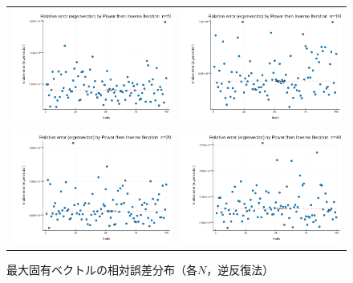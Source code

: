 \documentclass[a4paper,11pt]{ltjsarticle}
\begin{document}
\begin{figure}[H]
  \centering
  \begin{tabular}{cc}
    \includegraphics[width=72mm]{graphs/exp4_n50_relerr_eigenvector.png} &
    \includegraphics[width=72mm]{graphs/exp4_n100_relerr_eigenvector.png} \\
    \includegraphics[width=72mm]{graphs/exp4_n200_relerr_eigenvector.png} &
    \includegraphics[width=72mm]{graphs/exp4_n400_relerr_eigenvector.png} \\
  \end{tabular}
  \caption{最大固有ベクトルの相対誤差分布（各$N$，逆反復法）}
  \label{fig:exp4_relerr_v}
\end{figure}
\end{document}
